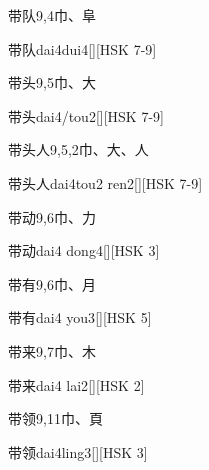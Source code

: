 \begin{Entry}{带队}{9,4}{⼱、⾩}
  \begin{Phonetics}{带队}{dai4dui4}[][HSK 7-9]
  \end{Phonetics}
\end{Entry}

\begin{Entry}{带头}{9,5}{⼱、⼤}
  \begin{Phonetics}{带头}{dai4/tou2}[][HSK 7-9]
  \end{Phonetics}
\end{Entry}

\begin{Entry}{带头人}{9,5,2}{⼱、⼤、⼈}
  \begin{Phonetics}{带头人}{dai4tou2 ren2}[][HSK 7-9]
  \end{Phonetics}
\end{Entry}

\begin{Entry}{带动}{9,6}{⼱、⼒}
  \begin{Phonetics}{带动}{dai4 dong4}[][HSK 3]
  \end{Phonetics}
\end{Entry}

\begin{Entry}{带有}{9,6}{⼱、⽉}
  \begin{Phonetics}{带有}{dai4 you3}[][HSK 5]
  \end{Phonetics}
\end{Entry}

\begin{Entry}{带来}{9,7}{⼱、⽊}
  \begin{Phonetics}{带来}{dai4 lai2}[][HSK 2]
  \end{Phonetics}
\end{Entry}

\begin{Entry}{带领}{9,11}{⼱、⾴}
  \begin{Phonetics}{带领}{dai4ling3}[][HSK 3]
  \end{Phonetics}
\end{Entry}

